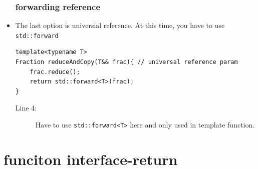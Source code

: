 \documentclass[a4paper,11pt,twoside]{book}
\begin{document}
\begin{itemize}
\subsubsection{forwarding reference}

    \item The last option is universial reference. At this time, you have to use \texttt{std::forward} 
\begin{lstlisting}[]
template<typename T>
Fraction reduceAndCopy(T&& frac){ // universal reference param
	frac.reduce();
	return std::forward<T>(frac); 
} 
\end{lstlisting}
\begin{description}
	\item[Line 4:] Have to use \texttt{std::forward<T>} here and only used in template function.
\end{description}

\end{itemize}

\section{funciton interface-return}
\end{document}
